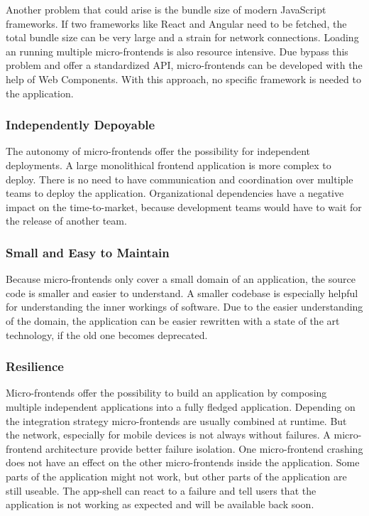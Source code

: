 Another problem that could arise is the bundle size of modern JavaScript frameworks. If two frameworks like React and Angular need to be fetched, the total bundle size can be very large and a strain for network connections. Loading an running multiple micro-frontends is also resource intensive. Due bypass this problem and offer a standardized API, micro-frontends can be developed with the help of Web Components. With this approach, no specific framework is needed to the application. \cite{book:2020:geers:background:micro-frontends:micro-frontends-in-action} 

\subsubsection{Independently Depoyable}

The autonomy of micro-frontends offer the possibility for independent deployments. A large monolithical frontend application is more complex to deploy. There is no need to have communication and coordination over multiple teams to deploy the application. Organizational dependencies have a negative impact on the time-to-market, because development teams would have to wait for the release of another team. \cite{book:2020:geers:background:micro-frontends:micro-frontends-in-action} 

\subsubsection{Small and Easy to Maintain}

Because micro-frontends only cover a small domain of an application, the source code is smaller and easier to understand. A smaller codebase is especially helpful for understanding the inner workings of software. 
Due to the easier understanding of the domain, the application can be easier rewritten with a state of the art technology, if the old one becomes deprecated. \cite{book:2020:geers:background:micro-frontends:micro-frontends-in-action}

\subsubsection{Resilience}

Micro-frontends offer the possibility to build an application by composing multiple independent applications into a fully fledged application. Depending on the integration strategy micro-frontends are usually combined at runtime. But the network, especially for mobile devices is not always without failures. A micro-frontend architecture provide better failure isolation. One micro-frontend crashing does not have an effect on the other micro-frontends inside the application. Some parts of the application might not work, but other parts of the application are still useable. The app-shell can react to a failure and tell users that the application is not working as expected and will be available back soon. \cite{article:2021:perltonen:background:micro-frontends:motivations-benefits-and-issues}

